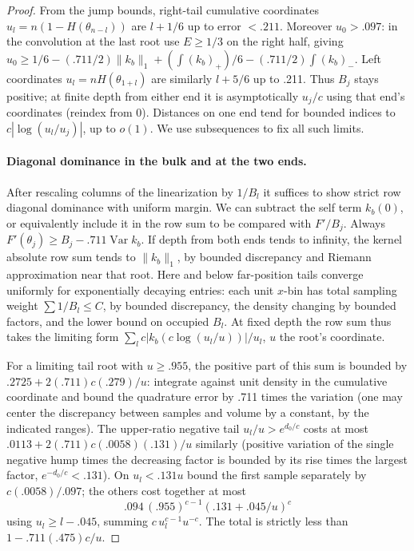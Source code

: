 \documentclass[11pt]{article}
\numberwithin{equation}{section}
\theoremstyle{definition}\newtheorem{definition}[theorem]{Definition}
\theoremstyle{remark}\newtheorem{remark}[theorem]{Remark}
\begin{document}
\begin{proof}
From the jump bounds, right-tail cumulative coordinates \(u_l=n(1-H(\theta_{n-l}))\) are \(l+1/6\) up to error \(<.211\). Moreover \(u_0>.097\): in the convolution at the last root use \(E\ge1/3\) on the right half, giving
\(u_0\ge1/6-(.711/2)\|k_b\|_1+(\int(k_b)_+)/6-(.711/2)\int(k_b)_-\).
Left coordinates \(u_l=nH(\theta_{1+l})\) are similarly \(l+5/6\) up to .211. Thus \(B_j\) stays positive; at finite depth from either end it is asymptotically \(u_j/c\) using that end's coordinates (reindex from 0). Distances on one end tend for bounded indices to \(c|\log(u_l/u_j)|\), up to \(o(1)\). We use subsequences to fix all such limits.

\paragraph{Diagonal dominance in the bulk and at the two ends.}
After rescaling columns of the linearization by \(1/B_l\) it suffices to show strict row diagonal dominance with uniform margin. We can subtract the self term \(k_b(0)\), or equivalently include it in the row sum to be compared with \(F'/B_j\). Always \(F'(\theta_j)\ge B_j-.711\operatorname{Var} k_b\). If depth from both ends tends to infinity, the kernel absolute row sum tends to \(\|k_b\|_1\), by bounded discrepancy and Riemann approximation near that root. Here and below far-position tails converge uniformly for exponentially decaying entries: each unit \(x\)-bin has total sampling weight \(\sum 1/B_l\le C\), by bounded discrepancy, the density changing by bounded factors, and the lower bound on occupied \(B_l\). At fixed depth the row sum thus takes the limiting form
\(\sum_l c |k_b(c\log(u_l/u))|/u_l\), \(u\) the root's coordinate.

For a limiting tail root with \(u\ge .955\), the positive part of this sum is bounded by
\(.2725+2(.711)c(.279)/u\): integrate against unit density in the cumulative coordinate and bound the quadrature error by .711 times the variation (one may center the discrepancy between samples and volume by a constant, by the indicated ranges). The upper-ratio negative tail \(u_l/u>e^{d_0/c}\) costs at most
\(.0113+2(.711)c(.0058)(.131)/u\) similarly (positive variation of the single negative hump times the decreasing factor is bounded by its rise times the largest factor, \(e^{-d_0/c}<.131\)). On \(u_l<.131u\) bound the first sample separately by \(c(.0058)/.097\); the others cost together at most
\[
 .094\,(.955)^{c-1}(.131+.045/u)^c
\]
using \(u_l\ge l-.045\), summing \(c\,u_l^{c-1}u^{-c}\). The total is strictly less than \(1-.711(.475)c/u\). 


\end{proof}
\end{document}
